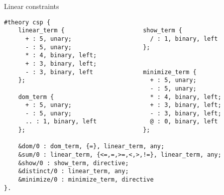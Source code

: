 \begin{frame}[fragile,shrink=1]{Linear constraints}
\begin{lstlisting}
#theory csp {
    linear_term {                      show_term {
      + : 5, unary;                      / : 1, binary, left
      - : 5, unary;                    };
      * : 4, binary, left;
      + : 3, binary, left;
      - : 3, binary, left              minimize_term {
    };                                   + : 5, unary;
                                         - : 5, unary;
    dom_term {                           * : 4, binary, left;
      + : 5, unary;                      + : 3, binary, left;
      - : 5, unary;                      - : 3, binary, left;
      .. : 1, binary, left               @ : 0, binary, left
    };                                 };

    &dom/0 : dom_term, {=}, linear_term, any;
    &sum/0 : linear_term, {<=,=,>=,<,>,!=}, linear_term, any;
    &show/0 : show_term, directive;
    &distinct/0 : linear_term, any;
    &minimize/0 : minimize_term, directive
}.
\end{lstlisting}
\end{frame}
%
